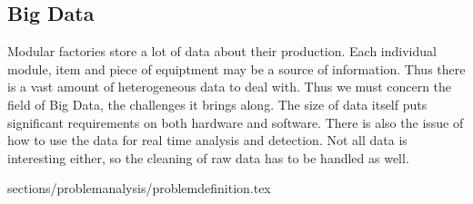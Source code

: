 \subsection{Big Data}
Modular factories store a lot of data about their production. Each individual module, item and piece of equiptment may be a source of information. Thus there is a vast amount of heterogeneous data to deal with. Thus we must concern the field of Big Data, the challenges it brings along. The size of data itself puts significant requirements on both hardware and software. There is also the issue of how to use the data for real time analysis and detection. Not all data is interesting either, so the cleaning of raw data has to be handled as well.\cite{Yin2015} 

 {sections/problemanalysis/problemdefinition.tex}

